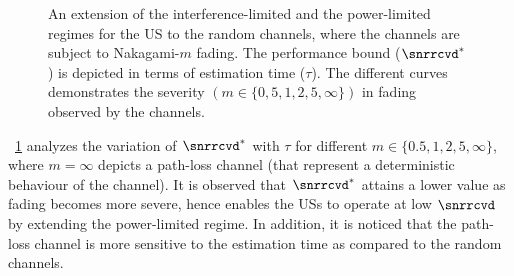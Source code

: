 {\begin{figure}[!ht]

\centering
{}
\caption{An extension of the interference-limited and the power-limited regimes for the US to the random channels, where the channels are subject to Nakagami-$m$ fading. The performance bound ($\snrrcvd^*$) is depicted in terms of estimation time ($\tau$). The different curves demonstrates the severity $(m \in \{0,5,1,2,5, \infty \})$ in fading observed by the channels.}
\label{fig:or_fad}
\end{figure}
\begin{remark} \label{rm:rm2}
\normalfont
\figurename~\ref{fig:or_fad} analyzes the variation of $\snrrcvd^*$ with $\tau$ for different $m \in \{0.5, 1, 2, 5, \infty\}$, where $m = \infty$ depicts a path-loss channel (that represent a deterministic behaviour of the channel). It is observed that $\snrrcvd^*$ attains a lower value as fading becomes more severe, hence enables the USs to operate at low $\snrrcvd$ by extending the power-limited regime. In addition, it is noticed that the path-loss channel is more sensitive to the estimation time as compared to the random channels.  
\end{remark}

}
